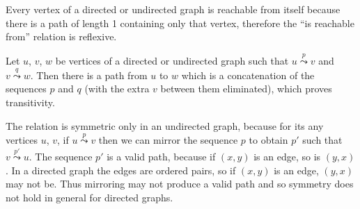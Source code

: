 \exercise
Every vertex of a directed or undirected graph is reachable from itself because there is a path of length 1 containing only that vertex, therefore the ``is reachable from'' relation is reflexive.

Let $u$, $v$, $w$ be vertices of a directed or undirected graph such that $u\overset{p}{\leadsto}v$ and $v\overset{q}{\leadsto}w$.
Then there is a path from $u$ to $w$ which is a concatenation of the sequences $p$ and $q$ (with the extra $v$ between them eliminated), which proves transitivity.

The relation is symmetric only in an undirected graph, because for its any vertices $u$, $v$, if $u\overset{p}{\leadsto}v$ then we can mirror the sequence $p$ to obtain $p'$ such that $v\overset{p'}{\leadsto}u$.
The sequence $p'$ is a valid path, because if $(x,y)$ is an edge, so is $(y,x)$.
In a directed graph the edges are ordered pairs, so if $(x,y)$ is an edge, $(y,x)$ may not be.
Thus mirroring may not produce a valid path and so symmetry does not hold in general for directed graphs.
